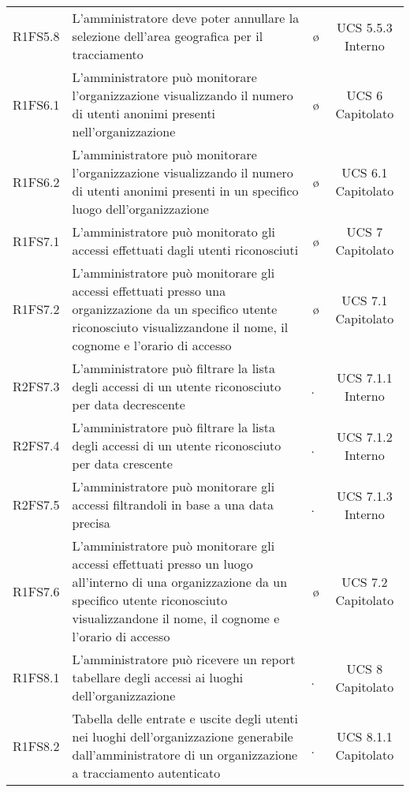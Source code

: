 {\begin{longtable}{ c C{8cm} c c}
R1FS5.8 & L'amministratore deve poter annullare la selezione dell'area geografica per il tracciamento& \o & UCS 5.5.3 Interno\\

R1FS6.1 & L'amministratore può monitorare l'organizzazione visualizzando il numero di utenti anonimi presenti nell'organizzazione & \o & UCS 6 Capitolato\\

R1FS6.2 & L'amministratore può monitorare l'organizzazione visualizzando il numero di utenti anonimi presenti in un specifico luogo dell'organizzazione  & \o & UCS 6.1 Capitolato\\

R1FS7.1 & L'amministratore può monitorato gli accessi effettuati dagli utenti riconosciuti & \o & UCS 7 Capitolato\\

R1FS7.2 & L'amministratore può monitorare gli accessi effettuati presso una organizzazione da un specifico utente riconosciuto visualizzandone il nome, il cognome e l'orario di accesso & \o & UCS 7.1 Capitolato\\

R2FS7.3 & L’amministratore può filtrare la lista degli accessi di un utente riconosciuto per data decrescente & \d & UCS 7.1.1 Interno \\

R2FS7.4 & L’amministratore può filtrare la lista degli accessi di un utente riconosciuto per data crescente & \d & UCS 7.1.2 Interno \\

R2FS7.5 & L'amministratore può monitorare gli accessi filtrandoli in base a una data precisa & \d & UCS 7.1.3 Interno\\

R1FS7.6 & L'amministratore può monitorare gli accessi effettuati presso un luogo all'interno di una organizzazione da un specifico utente riconosciuto visualizzandone il nome, il cognome e l'orario di accesso & \o & UCS 7.2 Capitolato\\

R1FS8.1 & L'amministratore può ricevere un report tabellare degli accessi ai luoghi dell'organizzazione & \d & UCS 8 Capitolato\\

R1FS8.2 &  Tabella delle entrate e uscite degli utenti nei luoghi dell'organizzazione generabile dall'amministratore di un organizzazione a tracciamento autenticato & \d & UCS 8.1.1 Capitolato\\


\end{longtable}}
